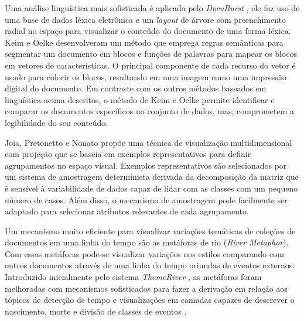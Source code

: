 Uma análise linguística mais sofisticada é aplicada pelo \textit{DocuBurst} \cite{collins2009docuburst}, ele faz uso de uma base de dados léxica eletrônica e um \textit{layout} de árvore com preenchimento radial no espaço para visualizar o conteúdo do documento de uma forma léxica. Keim e Oelke \cite{keim2007literature} desenvolveram um método que emprega regras semânticas para segmentar um documento em blocos e funções de palavras para mapear os blocos em vetores de características. O principal componente de cada recurso do vetor é usado para colorir os blocos, resultando em uma imagem como uma impressão digital do documento. Em contraste com os outros métodos  baseados em linguística acima descritos, o método de Keim e Oelke \cite{keim2007literature} permite identificar e comparar os documentos específicos no conjunto de dados, mas, comprometem a legibilidade do seu conteúdo.


Joia, Pretonetto e Nonato \cite{joia2015uncovering} propõe uma técnica de visualização multidimensional com projeção que se baseia em exemplos representativos para definir agrupamentos no espaço visual. Exemplos representativos são selecionados por um sistema de amostragem determinista derivada da decomposição da matriz que é sensível à variabilidade de dados capaz de lidar com as classes com um pequeno número de casos. Além disso, o mecanismo de amostragem pode facilmente ser adaptado para selecionar atributos relevantes de cada agrupamento.

Um mecanismo muito eficiente para visualizar variações temáticas de coleções de documentos em uma linha do tempo são as metáforas de rio (\textit{River Metaphor}). Com essas metáforas pode-se visualizar variações nos estilos comparando com outros documentos através de uma linha do tempo oriundas de eventos externos. Introduzido inicialmente pelo sistema \textit{ThemeRiver} \cite{havre2002themeriver}, as metáforas foram melhoradas com mecanismos sofisticados para fazer a derivação em relação aos tópicos de detecção de tempo \cite{liu2012tiara} e visualizações em camadas capazes de descrever o nascimento, morte e divisão de classes de eventos \cite{cui2011textflow}. 

